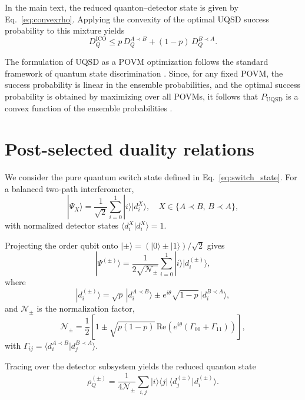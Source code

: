 \documentclass[aps,pra,reprint,superscriptaddress]{revtex4-2}
\begin{document}
In the main text, the reduced quanton--detector state is given by Eq.~\eqref{eq:convexrho}. Applying the convexity of the optimal UQSD success probability to this mixture yields
\begin{equation}
D_Q^{\mathrm{ICO}}
\le
p\,D_Q^{A\prec B}
+
(1-p)\,D_Q^{B\prec A}.
\end{equation}

The formulation of UQSD as a POVM optimization follows the
standard framework of quantum state discrimination
\cite{Chefles2000,Bergou2007}. Since, for any fixed POVM,
the success probability is linear in the ensemble
probabilities, and the optimal success probability is
obtained by maximizing over all POVMs, it follows that
$P_{\mathrm{UQSD}}$ is a convex function of the ensemble
probabilities \cite[Sec.~3.2.3]{Boyd2004}.

\section{Post-selected duality relations}
\label{app:post_selected_derivation}

We consider the pure quantum switch state defined in Eq.~\eqref{eq:switch_state}.
For a balanced two-path interferometer,
\begin{equation}
|\Psi_X\rangle = \frac{1}{\sqrt{2}} \sum_{i=0}^1 |i\rangle |d_i^X\rangle,
\quad X\in\{A\prec B,\,B\prec A\},
\end{equation}
with normalized detector states $\langle d_i^X|d_i^X\rangle=1$.

Projecting the order qubit onto $|\pm\rangle=(|0\rangle\pm|1\rangle)/\sqrt{2}$ gives
\begin{equation}
|\Psi^{(\pm)}\rangle
=
\frac{1}{2\sqrt{\mathcal{N}_\pm}}
\sum_{i=0}^1 |i\rangle |d_i^{(\pm)}\rangle,
\end{equation}
where
\begin{equation}
|d_i^{(\pm)}\rangle
=
\sqrt{p}\,|d_i^{A\prec B}\rangle
\pm
e^{i\theta}\sqrt{1-p}\,|d_i^{B\prec A}\rangle,
\end{equation}
and $\mathcal{N}_\pm$ is the normalization factor,
\begin{equation}
\mathcal{N}_\pm
=
\frac{1}{2}
\left[
1 \pm \sqrt{p(1-p)}\,\mathrm{Re}\!\left(
e^{i\theta}(\Gamma_{00}+\Gamma_{11})
\right)
\right],
\end{equation}
with $\Gamma_{ij}=\langle d_i^{A\prec B}|d_j^{B\prec A}\rangle$.

Tracing over the detector subsystem yields the reduced quanton state
\begin{equation}
\rho_Q^{(\pm)}
=
\frac{1}{4\mathcal{N}_\pm}
\sum_{i,j}
|i\rangle\langle j|\,
\langle d_j^{(\pm)}|d_i^{(\pm)}\rangle.
\end{equation}
\end{document}
